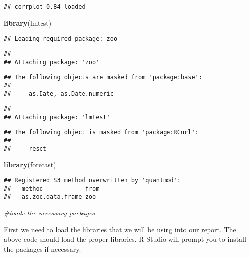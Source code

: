 \documentclass[
]{article}
\newenvironment{Shaded}{\begin{snugshade}}{\end{snugshade}}
\newcommand{\CommentTok}[1]{\textcolor[rgb]{0.56,0.35,0.01}{\textit{#1}}}
\newcommand{\KeywordTok}[1]{\textcolor[rgb]{0.13,0.29,0.53}{\textbf{#1}}}
\newcommand{\NormalTok}[1]{#1}
\begin{document}
\begin{verbatim}
## corrplot 0.84 loaded
\end{verbatim}

\begin{Shaded}
\begin{Highlighting}[]
\KeywordTok{library}\NormalTok{(lmtest)}
\end{Highlighting}
\end{Shaded}

\begin{verbatim}
## Loading required package: zoo
\end{verbatim}

\begin{verbatim}
## 
## Attaching package: 'zoo'
\end{verbatim}

\begin{verbatim}
## The following objects are masked from 'package:base':
## 
##     as.Date, as.Date.numeric
\end{verbatim}

\begin{verbatim}
## 
## Attaching package: 'lmtest'
\end{verbatim}

\begin{verbatim}
## The following object is masked from 'package:RCurl':
## 
##     reset
\end{verbatim}

\begin{Shaded}
\begin{Highlighting}[]
\KeywordTok{library}\NormalTok{(forecast)}
\end{Highlighting}
\end{Shaded}

\begin{verbatim}
## Registered S3 method overwritten by 'quantmod':
##   method            from
##   as.zoo.data.frame zoo
\end{verbatim}

\begin{Shaded}
\begin{Highlighting}[]
\CommentTok{#loads the necessary packages}
\end{Highlighting}
\end{Shaded}

First we need to load the libraries that we will be using into our
report. The above code should load the proper libraries. R Studio will
prompt you to install the packages if necessary.
\end{document}
